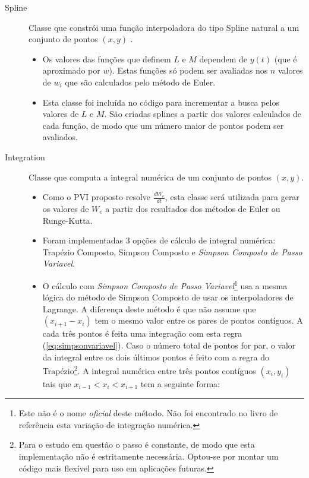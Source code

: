 \documentclass[final,5p]{elsarticle}
\numberwithin{equation}{section}
\begin{document}
\begin{description}
            \item[Spline] Classe que constrói uma função interpoladora do tipo Spline natural a um conjunto de pontos $(x,y)$ \cite{relatoriosplinesnaturais}.
            \begin{itemize}
                \item Os valores das funções que definem $L$ e $M$ dependem de $y(t)$ (que é aproximado por $w$). Estas funções só podem ser avaliadas nos $n$ valores de $w_i$ que são calculados pelo método de Euler.
                \item Esta classe foi incluída no código para incrementar a busca pelos valores de $L$ e $M$. São criadas splines a partir dos valores calculados de cada função, de modo que um número maior de pontos podem ser avaliados.
            \end{itemize}

            \item[Integration] Classe que computa a integral numérica de um conjunto de pontos $(x,y)$.
            \begin{itemize}
                \item Como o PVI proposto resolve $\frac{dW_e}{dt}$, esta classe será utilizada para gerar os valores de $W_e$ a partir dos resultados dos métodos de Euler ou Runge-Kutta.
                \item Foram implementadas 3 opções de cálculo de integral numérica: Trapézio Composto, Simpson Composto e \emph{Simpson Composto de Passo Variavel}.
                \item O cálculo com \emph{Simpson Composto de Passo Variavel}\footnote{Este não é o nome \emph{oficial} deste método. Não foi encontrado no livro de referência esta variação de integração numérica.} usa a mesma lógica do método de Simpson Composto de usar os interpoladores de Lagrange. A diferença deste método é que não assume que $(x_{i+1}-x_i)$ tem o mesmo valor entre os pares de pontos contíguos. A cada três pontos é feita uma integração com esta regra (\ref{eq:simpsonvariavel}). Caso o número total de pontos for par, o valor da integral entre os dois últimos pontos é feito com a regra do Trapézio\footnote{Para o estudo em questão o passo é constante, de modo que esta implementação não é estritamente necessária. Optou-se por montar um código mais flexível para uso em aplicações futuras.}. A integral numérica entre três pontos contíguos $(x_i,y_i)$ tais que $x_{i-1}<x_{i}<x_{i+1}$ tem a seguinte forma:
            \end{itemize}


\end{description}
\end{document}
